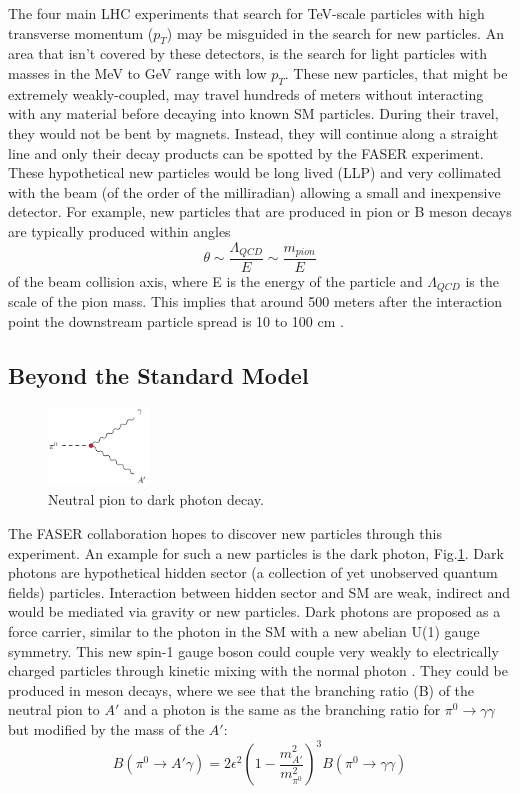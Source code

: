 The four main LHC experiments that search for TeV-scale particles with high transverse momentum ($p_{T}$) may be misguided in the search for new particles. An area that isn't covered by these detectors, is the search for light particles with masses in the MeV to GeV range with low $p_{T}$. These new particles, that might be extremely weakly-coupled, may travel hundreds of meters without interacting with any material before decaying into known SM particles. During their travel, they would not be bent by magnets. Instead, they will continue along a straight line and only their decay products can be spotted by the FASER experiment. These hypothetical new particles would be long lived (LLP) and very collimated with the beam (of the order of the milliradian) allowing a small and inexpensive detector. For example, new particles that are produced in pion or B meson decays are typically produced within angles \[ \theta\sim\frac{\Lambda_{QCD}}{E}\sim\frac{m_{pion}}{E} \] of the beam collision axis, where E is the energy of the particle and $\Lambda_{QCD}$ is the scale of the pion mass. This implies that around 500 meters after the interaction point the downstream particle spread is 10 to 100 cm \cite{faser_collaboration_letter_2018}.

\subsection{Beyond the Standard Model}

\begin{figure}
  \centering
    \includegraphics[width=0.24\textwidth]{DarkPhoton.png} 
    \caption[Neutral Pion Decay]{Neutral pion to dark photon decay.}
    \label{fig:Dark Photon}
\end{figure}

The FASER collaboration hopes to discover new particles through this experiment. An example for such a new particles is the dark photon, Fig.\ref{fig:Dark Photon}. Dark photons are hypothetical hidden sector (a collection of yet unobserved quantum fields) particles. Interaction between hidden sector and SM are weak, indirect and would be mediated via gravity or new particles. Dark photons are proposed as a force carrier, similar to the photon in the SM with a new abelian U(1) gauge symmetry. This new spin-1 gauge boson could couple very weakly to electrically charged particles through kinetic mixing with the normal photon \cite{noauthor_dark_2019}.
They could be produced in meson decays, where we see that the branching ratio (B) of the neutral pion to $A'$ and a photon is the same as the branching ratio for $\pi^0 \rightarrow \gamma\gamma$ but modified by the mass of  the $A'$:
\[
B(\pi^0 \rightarrow A'\gamma)=2\epsilon^2\left( 1-\frac{m^2_{A'}}{m^2_{\pi^0}} \right)^3B(\pi^0 \rightarrow \gamma\gamma)
\]

